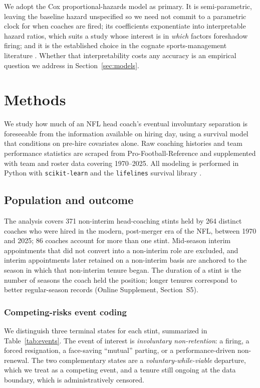 \documentclass[12pt,USenglish]{article}
\begin{document}
We adopt the Cox proportional-hazards model \citep{cox1972} as primary. It is semi-parametric, leaving the baseline hazard unspecified so we need not commit to a parametric clock for when coaches are fired; its coefficients exponentiate into interpretable hazard ratios, which suits a study whose interest is in \emph{which} factors foreshadow firing; and it is the established choice in the cognate sports-management literature \citep{salaga2020, gilfix2020}. Whether that interpretability costs any accuracy is an empirical question we address in Section~\ref{sec:models}.

\section{Methods}

We study how much of an NFL head coach's eventual involuntary separation is foreseeable from the information available on hiring day, using a survival model that conditions on pre-hire covariates alone. Raw coaching histories and team performance statistics are scraped from Pro-Football-Reference \citep{pfr} and supplemented with team and roster data covering 1970--2025. All modeling is performed in Python with \texttt{scikit-learn} \citep{pedregosa2011} and the \texttt{lifelines} survival library \citep{davidsonpilon2019}.

\subsection{Population and outcome}

The analysis covers 371 non-interim head-coaching stints held by 264 distinct coaches who were hired in the modern, post-merger era of the NFL, between 1970 and 2025; 86 coaches account for more than one stint. Mid-season interim appointments that did not convert into a non-interim role are excluded, and interim appointments later retained on a non-interim basis are anchored to the season in which that non-interim tenure began. The duration of a stint is the number of seasons the coach held the position; longer tenures correspond to better regular-season records (Online Supplement, Section~S5).

\subsubsection{Competing-risks event coding}
\label{sec:coding}

We distinguish three terminal states for each stint, summarized in Table~\ref{tab:events}. The event of interest is \emph{involuntary non-retention}: a firing, a forced resignation, a face-saving ``mutual'' parting, or a performance-driven non-renewal. The two complementary states are a \emph{voluntary-while-viable} departure, which we treat as a competing event, and a tenure still ongoing at the data boundary, which is administratively censored.
\end{document}
